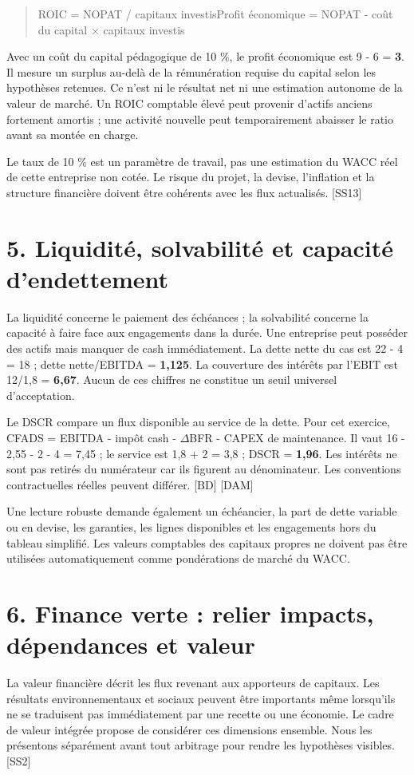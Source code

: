 \documentclass[12pt,a4paper]{article}
\begin{document}
\begin{quote}\small ROIC = NOPAT / capitaux investis\newline Profit économique = NOPAT - coût du capital $\times$ capitaux investis\end{quote}

Avec un coût du capital pédagogique de 10 \%, le profit économique est 9 - 6 = \textbf{3}. Il mesure un surplus au-delà de la rémunération requise du capital selon les hypothèses retenues. Ce n’est ni le résultat net ni une estimation autonome de la valeur de marché. Un ROIC comptable élevé peut provenir d’actifs anciens fortement amortis ; une activité nouvelle peut temporairement abaisser le ratio avant sa montée en charge.


Le taux de 10 \% est un paramètre de travail, pas une estimation du WACC réel de cette entreprise non cotée. Le risque du projet, la devise, l’inflation et la structure financière doivent être cohérents avec les flux actualisés. [SS13]

\section*{5. Liquidité, solvabilité et capacité d’endettement}
La liquidité concerne le paiement des échéances ; la solvabilité concerne la capacité à faire face aux engagements dans la durée. Une entreprise peut posséder des actifs mais manquer de cash immédiatement. La dette nette du cas est 22 - 4 = 18 ; dette nette/EBITDA = \textbf{1,125}. La couverture des intérêts par l’EBIT est 12/1,8 = \textbf{6,67}. Aucun de ces chiffres ne constitue un seuil universel d’acceptation.


Le DSCR compare un flux disponible au service de la dette. Pour cet exercice, CFADS = EBITDA - impôt cash - $\Delta$BFR - CAPEX de maintenance. Il vaut 16 - 2,55 - 2 - 4 = 7,45 ; le service est 1,8 + 2 = 3,8 ; DSCR = \textbf{1,96}. Les intérêts ne sont pas retirés du numérateur car ils figurent au dénominateur. Les conventions contractuelles réelles peuvent différer. [BD] [DAM]


Une lecture robuste demande également un échéancier, la part de dette variable ou en devise, les garanties, les lignes disponibles et les engagements hors du tableau simplifié. Les valeurs comptables des capitaux propres ne doivent pas être utilisées automatiquement comme pondérations de marché du WACC.

\section*{6. Finance verte : relier impacts, dépendances et valeur}
La valeur financière décrit les flux revenant aux apporteurs de capitaux. Les résultats environnementaux et sociaux peuvent être importants même lorsqu’ils ne se traduisent pas immédiatement par une recette ou une économie. Le cadre de valeur intégrée propose de considérer ces dimensions ensemble. Nous les présentons séparément avant tout arbitrage pour rendre les hypothèses visibles. [SS2]
\end{document}
